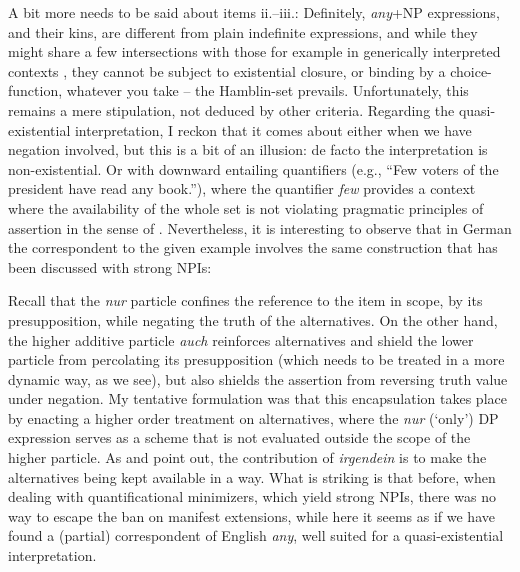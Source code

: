 \documentclass[output=paper,colorlinks,citecolor=brown,
]{langscibook}
\begin{document}
A bit more needs to be said about items ii.--iii.: Definitely, \textit{any}+NP expressions, and their kins, are
different from plain indefinite expressions, and while they might share a few intersections with those for example in
generically interpreted contexts \citep[cf.]{kadmonlandmann1993}, they cannot be subject to existential closure, or
binding by a choice-function, whatever you take -- the Hamblin-set prevails. Unfortunately, this remains a mere stipulation,
not deduced by other criteria. Regarding the quasi-existential interpretation, I reckon that it comes about either when
we have negation involved, but this is a bit of an illusion: de facto the interpretation is non-existential. Or with downward entailing quantifiers
(e.g., ``Few voters of the president have read any book.''), where the quantifier \textit{few} provides a context where
the availability of the whole set is not violating pragmatic principles of assertion in the sense of
\citet{krifka1995}. Nevertheless, it is interesting to observe that in German the correspondent to the given example
involves the same construction that has been discussed with strong NPIs:


Recall that the \textit{nur} particle confines the reference to the item in scope, by its presupposition, while negating
the truth of the alternatives. On the other hand, the higher additive particle \textit{auch} reinforces alternatives and shield the
lower particle from percolating its presupposition (which needs to be treated in a more dynamic way, as we see), but
also shields the assertion from reversing truth value under negation. My tentative formulation was that this
encapsulation takes place by enacting a higher order treatment on alternatives, where the \textit{nur} (`only') DP
expression serves as a scheme that is not evaluated outside the scope of the higher particle. As
\citet{kratzershimo2002} and \citet{kratzer2005} point out, the contribution of \textit{irgendein} is to make the
alternatives being kept available in a way. What is striking is that before, when dealing with quantificational
minimizers, which yield strong NPIs, there was no way to escape the ban on manifest extensions, while here it seems
as if we have found a (partial) correspondent of English \textit{any}, well suited for a quasi-existential
interpretation.
\end{document}
